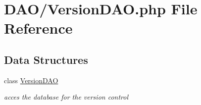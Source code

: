 \hypertarget{_version_d_a_o_8php}{}\section{D\+A\+O/\+Version\+D\+AO.php File Reference}
\label{_version_d_a_o_8php}
\subsection*{Data Structures}
\begin{DoxyCompactItemize}
\item 
class \hyperlink{class_version_d_a_o}{Version\+D\+AO}
\begin{DoxyCompactList}\small\item\em acces the database for the version control \end{DoxyCompactList}\end{DoxyCompactItemize}
